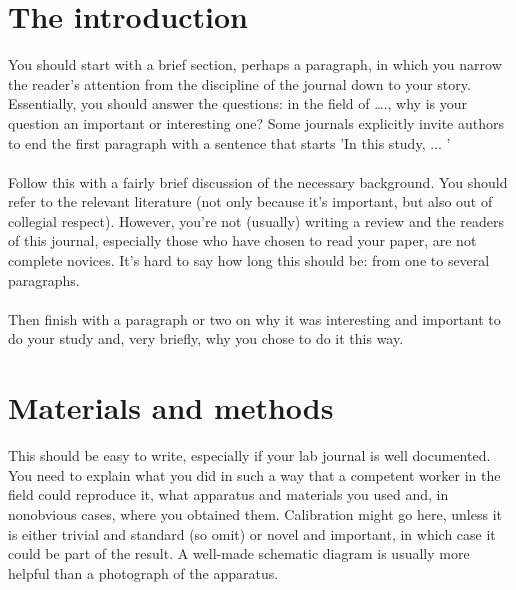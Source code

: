\documentclass[a4paper,12pt]{article}
\begin{document}
\section{The introduction}
You should start with a brief section, perhaps a paragraph, in which you narrow the reader’s attention from the discipline of the journal down to your story. Essentially, you should answer the questions: in the field of …., why is your question an important or interesting one? Some journals explicitly invite authors to end the first paragraph with a sentence that starts 'In this study, ... '\\\\Follow this with a fairly brief discussion of the necessary background. You should refer to the relevant literature (not only because it's important, but also out of collegial respect). However, you’re not (usually) writing a review and the readers of this journal, especially those who have chosen to read your paper, are not complete novices. It’s hard to say how long this should be: from one to several paragraphs.\\\\Then finish with a paragraph or two on why it was interesting and important to do your study and, very briefly, why you chose to do it this way. 
\section{Materials and methods}
This should be easy to write, especially if your lab journal is well documented. You need to explain what you did in such a way that a competent worker in the field could reproduce it, what apparatus and materials you used and, in nonobvious cases, where you obtained them. Calibration might go here, unless it is either trivial and standard (so omit) or novel and important, in which case it could be part of the result. A well-made schematic diagram is usually more helpful than a photograph of the apparatus.
\end{document}
